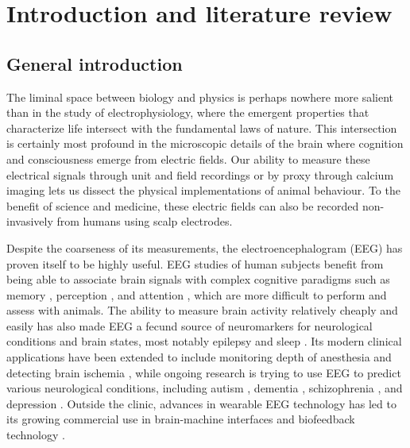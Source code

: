 \chapter{Introduction and literature review} \label{sec:intro}


\section{General introduction}

The liminal space between biology and physics is perhaps nowhere more salient than in the study of electrophysiology, where the emergent properties that characterize life intersect with the fundamental laws of nature. This intersection is certainly most profound in the microscopic details of the brain where cognition and consciousness emerge from electric fields. Our ability to measure these electrical signals through unit and field recordings or by proxy through calcium imaging lets us dissect the physical implementations of animal behaviour. To the benefit of science and medicine, these electric fields can also be recorded non-invasively from humans using scalp electrodes.

Despite the coarseness of its measurements, the electroencephalogram (EEG) has proven itself to be highly useful. EEG studies of human subjects benefit from being able to associate brain signals with complex cognitive paradigms such as memory \cite{Osipova2006, Sauseng2009, Sauseng2010}, perception \cite{Rodriguez1999, Melloni2007,Fahrenfort2012}, and attention \cite{Hillyard1998, Makeig2002}, which are more difficult to perform and assess with animals. The ability to measure brain activity relatively cheaply and easily has also made EEG a fecund source of neuromarkers for neurological conditions and brain states, most notably epilepsy \cite{Engel1984,Noachtar2009} and sleep \cite{Wolpert1969, Prerau2016}. Its modern clinical applications have been extended to include monitoring depth of anesthesia \cite{Michael2008} and detecting brain ischemia \cite{Meghdadi2021}, while ongoing research is trying to use EEG to predict various neurological conditions, including autism \cite{Bosl2018}, dementia \cite{Meghdadi2021}, schizophrenia \cite{Meghdadi2021}, and depression \cite{DeAguiarNeto2019}. Outside the clinic, advances in wearable EEG technology has led to its growing commercial use in brain-machine interfaces \cite{Mahmood2021} and biofeedback technology \cite{Hunkin2021}. 


